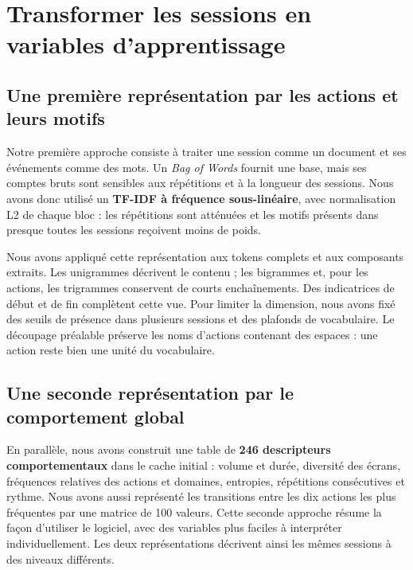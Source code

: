 \documentclass{rapportECL}
\begin{document}
\section{Transformer les sessions en variables d'apprentissage}
\subsection{Une première représentation par les actions et leurs motifs}

Notre première approche consiste à traiter une session comme un document et ses événements comme des mots. Un \emph{Bag of Words} fournit une base, mais ses comptes bruts sont sensibles aux répétitions et à la longueur des sessions. Nous avons donc utilisé un \textbf{TF-IDF à fréquence sous-linéaire}, avec normalisation L2 de chaque bloc : les répétitions sont atténuées et les motifs présents dans presque toutes les sessions reçoivent moins de poids.

Nous avons appliqué cette représentation aux tokens complets et aux composants extraits. Les unigrammes décrivent le contenu ; les bigrammes et, pour les actions, les trigrammes conservent de courts enchaînements. Des indicatrices de début et de fin complètent cette vue. Pour limiter la dimension, nous avons fixé des seuils de présence dans plusieurs sessions et des plafonds de vocabulaire. Le découpage préalable préserve les noms d'actions contenant des espaces : une action reste bien une unité du vocabulaire.

\subsection{Une seconde représentation par le comportement global}

En parallèle, nous avons construit une table de \textbf{246 descripteurs comportementaux} dans le cache initial : volume et durée, diversité des écrans, fréquences relatives des actions et domaines, entropies, répétitions consécutives et rythme. Nous avons aussi représenté les transitions entre les dix actions les plus fréquentes par une matrice de 100 valeurs. Cette seconde approche résume la façon d'utiliser le logiciel, avec des variables plus faciles à interpréter individuellement. Les deux représentations décrivent ainsi les mêmes sessions à des niveaux différents.

\end{document}
